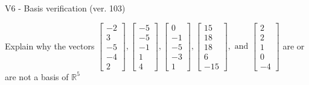 \begin{exercise}
  \begin{exerciseTitle}V6 - Basis verification (ver. 103)\end{exerciseTitle}
  \begin{exerciseStatement}
    Explain why the vectors \(\left[\begin{array}{r}
-2 \\
3 \\
-5 \\
-4 \\
2
\end{array}\right] , \left[\begin{array}{r}
-5 \\
-5 \\
-1 \\
1 \\
4
\end{array}\right] , \left[\begin{array}{r}
0 \\
-1 \\
-5 \\
-3 \\
1
\end{array}\right] , \left[\begin{array}{r}
15 \\
18 \\
18 \\
6 \\
-15
\end{array}\right] , \text{ and } \left[\begin{array}{r}
2 \\
2 \\
1 \\
0 \\
-4
\end{array}\right]\) are or are not a basis of \(\mathbb{R}^5\)	



\end{exerciseStatement}
\end{exercise}
